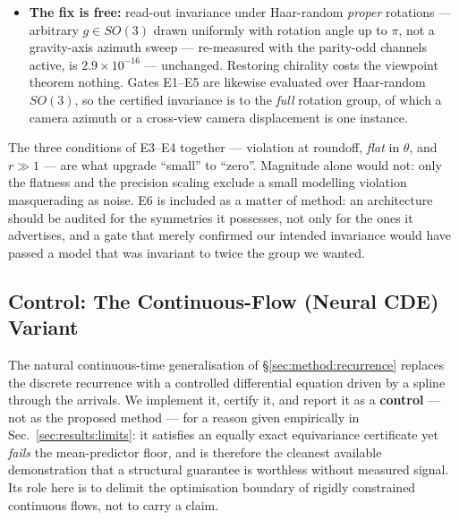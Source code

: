 \begin{itemize}
reflection) moves the score by $4.5\times10^{-2}$ and $6.2\times10^{-2}$ for the two cuts
respectively. Both models separate a left-limb from a right-limb movement
(Remark~\ref{rem:laterality}).
\item[E8] \textbf{The fix is free:} read-out invariance under Haar-random \emph{proper} rotations
--- arbitrary $g\in SO(3)$ drawn uniformly with rotation angle up to $\pi$, not a gravity-axis
azimuth sweep --- re-measured with the parity-odd channels active, is $2.9\times10^{-16}$ ---
unchanged. Restoring chirality costs the viewpoint theorem nothing. Gates E1--E5 are likewise
evaluated over Haar-random $SO(3)$, so the certified invariance is to the \emph{full} rotation group,
of which a camera azimuth or a cross-view camera displacement is one instance.
\end{itemize}
%
The three conditions of E3--E4 together --- violation at roundoff, \emph{flat} in $\theta$, and
$r\gg1$ --- are what upgrade ``small'' to ``zero''. Magnitude alone would not: only the flatness and
the precision scaling exclude a small modelling violation masquerading as noise. E6 is included as a
matter of method: an architecture should be audited for the symmetries it possesses, not only for the
ones it advertises, and a gate that merely confirmed our intended invariance would have passed a model
that was invariant to twice the group we wanted.

\subsection{Control: The Continuous-Flow (Neural CDE) Variant}
\label{sec:method:cde-control}

The natural continuous-time generalisation of \S\ref{sec:method:recurrence} replaces the discrete
recurrence with a controlled differential equation driven by a spline through the arrivals. We
implement it, certify it, and report it as a \textbf{control} --- not as the proposed method --- for a
reason given empirically in Sec.~\ref{sec:results:limits}: it satisfies an equally exact equivariance
certificate yet \emph{fails} the mean-predictor floor, and is therefore the cleanest available
demonstration that a structural guarantee is worthless without measured signal. Its role here is to
delimit the optimisation boundary of rigidly constrained continuous flows, not to carry a claim.

